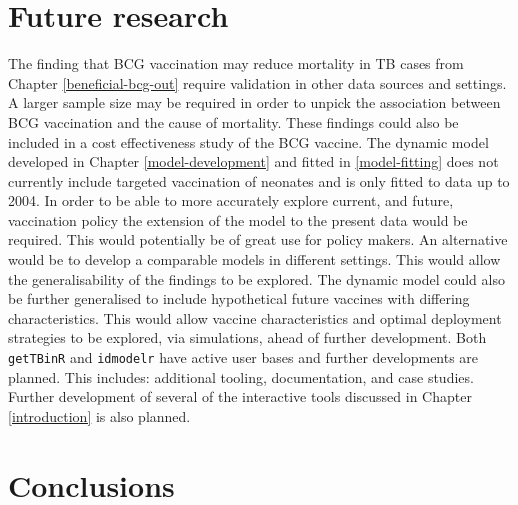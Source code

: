 \documentclass[11pt,twoside]{bristolthesis}
\begin{document}
  \hypertarget{future-research}{%
  \section{Future research}\label{future-research}}
  
  The finding that BCG vaccination may reduce mortality in TB cases from Chapter \ref{beneficial-bcg-out} require validation in other data sources and settings. A larger sample size may be required in order to unpick the association between BCG vaccination and the cause of mortality. These findings could also be included in a cost effectiveness study of the BCG vaccine. The dynamic model developed in Chapter \ref{model-development} and fitted in \ref{model-fitting} does not currently include targeted vaccination of neonates and is only fitted to data up to 2004. In order to be able to more accurately explore current, and future, vaccination policy the extension of the model to the present data would be required. This would potentially be of great use for policy makers. An alternative would be to develop a comparable models in different settings. This would allow the generalisability of the findings to be explored. The dynamic model could also be further generalised to include hypothetical future vaccines with differing characteristics. This would allow vaccine characteristics and optimal deployment strategies to be explored, via simulations, ahead of further development. Both \texttt{getTBinR} and \texttt{idmodelr} have active user bases and further developments are planned. This includes: additional tooling, documentation, and case studies. Further development of several of the interactive tools discussed in Chapter \ref{introduction} is also planned.
  
  \hypertarget{conclusions}{%
  \section{Conclusions}\label{conclusions}}
  
\end{document}
